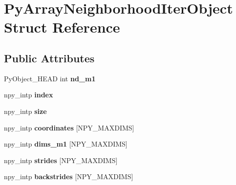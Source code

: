\hypertarget{structPyArrayNeighborhoodIterObject}{}\section{Py\+Array\+Neighborhood\+Iter\+Object Struct Reference}
\label{structPyArrayNeighborhoodIterObject}
\subsection*{Public Attributes}
\begin{DoxyCompactItemize}
\item 
Py\+Object\+\_\+\+H\+E\+AD int {\bfseries nd\+\_\+m1}\hypertarget{structPyArrayNeighborhoodIterObject_abe354ee737e4b3628ff71e67246b97c5}{}\label{structPyArrayNeighborhoodIterObject_abe354ee737e4b3628ff71e67246b97c5}

\item 
npy\+\_\+intp {\bfseries index}\hypertarget{structPyArrayNeighborhoodIterObject_a2b6c295a3b86f068498fc0a2a3c8112a}{}\label{structPyArrayNeighborhoodIterObject_a2b6c295a3b86f068498fc0a2a3c8112a}

\item 
npy\+\_\+intp {\bfseries size}\hypertarget{structPyArrayNeighborhoodIterObject_afba9ba4e022e923157055053346320ff}{}\label{structPyArrayNeighborhoodIterObject_afba9ba4e022e923157055053346320ff}

\item 
npy\+\_\+intp {\bfseries coordinates} \mbox{[}N\+P\+Y\+\_\+\+M\+A\+X\+D\+I\+MS\mbox{]}\hypertarget{structPyArrayNeighborhoodIterObject_ac81b42ebb783d293bc993949b73cb3c9}{}\label{structPyArrayNeighborhoodIterObject_ac81b42ebb783d293bc993949b73cb3c9}

\item 
npy\+\_\+intp {\bfseries dims\+\_\+m1} \mbox{[}N\+P\+Y\+\_\+\+M\+A\+X\+D\+I\+MS\mbox{]}\hypertarget{structPyArrayNeighborhoodIterObject_ab0a277cb701ff628ec7d168a9ba626d5}{}\label{structPyArrayNeighborhoodIterObject_ab0a277cb701ff628ec7d168a9ba626d5}

\item 
npy\+\_\+intp {\bfseries strides} \mbox{[}N\+P\+Y\+\_\+\+M\+A\+X\+D\+I\+MS\mbox{]}\hypertarget{structPyArrayNeighborhoodIterObject_a70fafa3772d4e7f3c2e52957bd0c0ea5}{}\label{structPyArrayNeighborhoodIterObject_a70fafa3772d4e7f3c2e52957bd0c0ea5}

\item 
npy\+\_\+intp {\bfseries backstrides} \mbox{[}N\+P\+Y\+\_\+\+M\+A\+X\+D\+I\+MS\mbox{]}\hypertarget{structPyArrayNeighborhoodIterObject_aff92c94b95d67773dd3aa0cd5df0dba8}{}\label{structPyArrayNeighborhoodIterObject_aff92c94b95d67773dd3aa0cd5df0dba8}


\end{DoxyCompactItemize}
